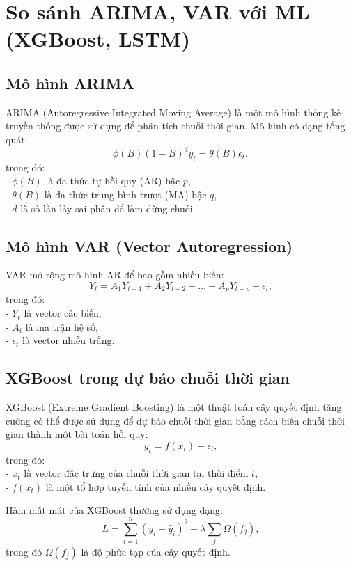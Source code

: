 \section{So sánh ARIMA, VAR với ML (XGBoost, LSTM)}
\subsection{Mô hình ARIMA}
ARIMA (Autoregressive Integrated Moving Average) là một mô hình thống kê truyền thống được sử dụng để phân tích chuỗi thời gian. Mô hình có dạng tổng quát:
\begin{equation}
    \phi(B) (1 - B)^d y_t = \theta(B) \epsilon_t,
\end{equation}
trong đó: \\
- $\phi(B)$ là đa thức tự hồi quy (AR) bậc $p$, \\
- $\theta(B)$ là đa thức trung bình trượt (MA) bậc $q$, \\
- $d$ là số lần lấy sai phân để làm dừng chuỗi.

\subsection{Mô hình VAR (Vector Autoregression)}
VAR mở rộng mô hình AR để bao gồm nhiều biến:
\begin{equation}
    Y_t = A_1 Y_{t-1} + A_2 Y_{t-2} + \dots + A_p Y_{t-p} + \epsilon_t,
\end{equation}
trong đó: \\
- $Y_t$ là vector các biến, \\
- $A_i$ là ma trận hệ số, \\
- $\epsilon_t$ là vector nhiễu trắng.

\subsection{XGBoost trong dự báo chuỗi thời gian}
XGBoost (Extreme Gradient Boosting) là một thuật toán cây quyết định tăng cường có thể được sử dụng để dự báo chuỗi thời gian bằng cách biến chuỗi thời gian thành một bài toán hồi quy:
\begin{equation}
    y_t = f(x_t) + \epsilon_t,
\end{equation}
trong đó: \\
- $x_t$ là vector đặc trưng của chuỗi thời gian tại thời điểm $t$, \\
- $f(x_t)$ là một tổ hợp tuyến tính của nhiều cây quyết định. 

Hàm mất mát của XGBoost thường sử dụng dạng:
\begin{equation}
    L = \sum_{i=1}^{n} (y_i - \hat{y}_i)^2 + \lambda \sum_{j} \Omega(f_j),
\end{equation}
trong đó $\Omega(f_j)$ là độ phức tạp của cây quyết định.

